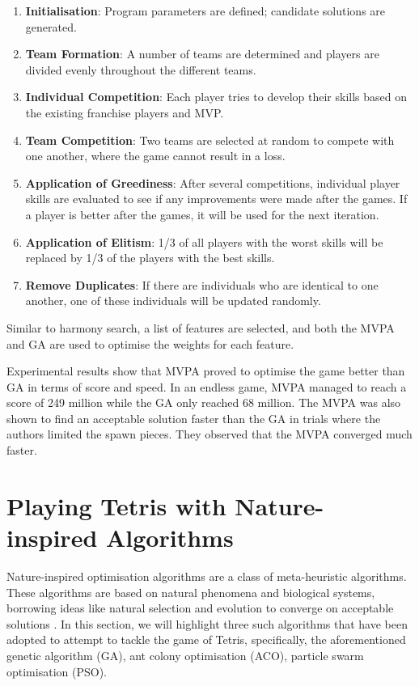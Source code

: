 \documentclass[a4paper, 12pt]{extreport}
\begin{document}
	\begin{enumerate}
		\item \textbf{Initialisation}: Program parameters are defined; candidate solutions are generated.
		\item \textbf{Team Formation}: A number of teams are determined and players are divided evenly throughout the different teams.
		\item \textbf{Individual Competition}: Each player tries to develop their skills based on the existing franchise players and MVP.
		\item \textbf{Team Competition}: Two teams are selected at random to compete with one another, where the game cannot result in a loss.
		\item \textbf{Application of Greediness}: After several competitions, individual player skills are evaluated to see if any improvements were made after the games. If a player is better after the games, it will be used for the next iteration.
		\item \textbf{Application of Elitism}: 1/3 of all players with the worst skills will be replaced by 1/3 of the players with the best skills.
		\item \textbf{Remove Duplicates}: If there are individuals who are identical to one another, one of these individuals will be updated randomly.
	\end{enumerate}
	
	Similar to harmony search, a list of features are selected, and both the MVPA and GA are used to optimise the weights for each feature.
	
	Experimental results show that MVPA proved to optimise the game better than GA in terms of score and speed. In an endless game, MVPA managed to reach a score of 249 million while the GA only reached 68 million. The MVPA was also shown to find an acceptable solution faster than the GA in trials where the authors limited the spawn pieces. They observed that the MVPA converged much faster.
	
	\section{Playing Tetris with Nature-inspired Algorithms} \label{sec:nia-tetris}
	
	Nature-inspired optimisation algorithms are a class of meta-heuristic algorithms. These algorithms are based on natural phenomena and biological systems, borrowing ideas like natural selection and evolution to converge on acceptable solutions \cite{nia-soft-computing}. In this section, we will highlight three such algorithms that have been adopted to attempt to tackle the game of Tetris, specifically, the aforementioned genetic algorithm (GA), ant colony optimisation (ACO), particle swarm optimisation (PSO).
	
\end{document}
